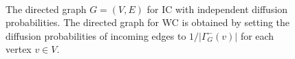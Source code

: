 \documentclass[review]{elsarticle}
\newcommand\kktodo[1]{\textcolor{red}{#1}}
\begin{document}
\begin{figure}[!ht] 
    \centering
    \\%
  \caption{\small{\protect{} 
The directed graph $G = (V, E)$ for IC with independent diffusion probabilities. 
\protect{}
The directed graph for WC is obtained by setting the diffusion probabilities of incoming edges to $1 / |\Gamma^-_G(v)|$ for each vertex $v \in V$.%
  }}
  \label{fig:xx} 
\end{figure}
\end{document}
